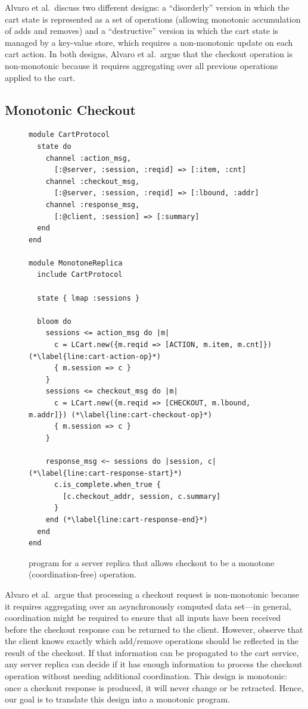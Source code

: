 Alvaro et al.\ discuss two different designs: a ``disorderly'' version in which
the cart state is represented as a set of operations (allowing monotonic
accumulation of adds and removes) and a ``destructive'' version in which the
cart state is managed by a key-value store, which requires a non-monotonic
update on each cart action. In both designs, Alvaro et al.\ argue that the
checkout operation is non-monotonic because it requires aggregating over all
previous operations applied to the cart.

\subsection{Monotonic Checkout}
\begin{figure}[t]
\begin{scriptsize}

\begin{lstlisting}
module CartProtocol
  state do
    channel :action_msg,
      [:@server, :session, :reqid] => [:item, :cnt]
    channel :checkout_msg,
      [:@server, :session, :reqid] => [:lbound, :addr]
    channel :response_msg,
      [:@client, :session] => [:summary]
  end
end

module MonotoneReplica
  include CartProtocol

  state { lmap :sessions }

  bloom do
    sessions <= action_msg do |m|
      c = LCart.new({m.reqid => [ACTION, m.item, m.cnt]}) (*\label{line:cart-action-op}*)
      { m.session => c }
    }
    sessions <= checkout_msg do |m|
      c = LCart.new({m.reqid => [CHECKOUT, m.lbound, m.addr]}) (*\label{line:cart-checkout-op}*)
      { m.session => c }
    }

    response_msg <~ sessions do |session, c| (*\label{line:cart-response-start}*)
      c.is_complete.when_true {
        [c.checkout_addr, session, c.summary]
      }
    end (*\label{line:cart-response-end}*)
  end
end
\end{lstlisting}
\end{scriptsize}
\caption{\lang program for a server replica that allows checkout to be a
  monotone (coordination-free) operation.}
\label{fig:monotone-cart}
\end{figure}

Alvaro et al.\ argue that processing a checkout request is non-monotonic because
it requires aggregating over an asynchronously computed data set---in general,
coordination might be required to ensure that all inputs have been received
before the checkout response can be returned to the client. However, observe
that the client knows exactly which add/remove operations should be reflected in
the result of the checkout. If that information can be propagated to the cart
service, any server replica can decide if it has enough information to process
the checkout operation without needing additional coordination. This design is
monotonic: once a checkout response is produced, it will never change or be
retracted. Hence, our goal is to translate this design into a monotonic \lang
program.

